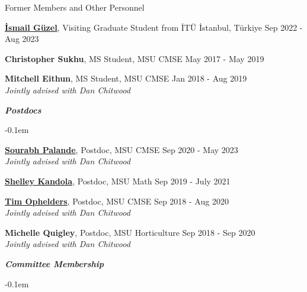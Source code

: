\documentclass{resume} %
\begin{document}
\begin{rSection}{Former Members and Other Personnel}
\begin{list}{}{\leftmargin=1em}
   \item \textbf{\href{https://ismailguzel.github.io/}{\.{I}smail G\"{u}zel}}, Visiting Graduate Student from  İTÜ İstanbul, Türkiye \hfill Sep 2022 - Aug 2023

   \item \textbf{Christopher Sukhu}, MS Student, MSU CMSE \hfill May 2017 - May 2019

   \item \textbf{Mitchell Eithun}, MS Student, MSU CMSE \hfill Jan 2018 - Aug 2019
\\
   \phantom{XXX} \textit{Jointly advised with Dan Chitwood}
\end{list}

   \textbf{\textit{Postdocs}}
   \begin{list}{}{\leftmargin=1em}
      \itemsep -0.1em 
   \item \textbf{\href{http://sci.utah.edu/~sourabh/}{Sourabh Palande}}, Postdoc, MSU CMSE \hfill Sep 2020 - May 2023\\
   \phantom{XXX} \textit{Jointly advised with Dan Chitwood}

   \item \textbf{\href{www.shelleykandola.com}{Shelley Kandola}}, Postdoc, MSU Math \hfill Sep 2019 - July 2021

   \item \textbf{\href{https://research.tue.nl/en/persons/tim-ae-ophelders}{Tim Ophelders}}, Postdoc, MSU CMSE \hfill Sep 2018 - Aug 2020\\
   \phantom{XXX} \textit{Jointly advised with Dan Chitwood}
   \item \textbf{Michelle Quigley}, Postdoc, MSU Horticulture \hfill Sep 2018 - Sep 2020\\
   \phantom{XXX} \textit{Jointly advised with Dan Chitwood}
\end{list}

\textbf{\textit{Committee Membership}}
\begin{list}{}{\leftmargin=1em}
   \itemsep -0.1em %







\end{list}
\end{rSection}
\end{document}
